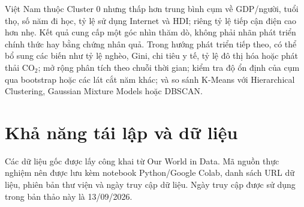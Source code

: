 \documentclass[11pt,a4paper]{article}
\begin{document}
Việt Nam thuộc Cluster 0 nhưng thấp hơn trung bình cụm về GDP/người, tuổi thọ, số năm đi học, tỷ lệ sử dụng Internet và HDI; riêng tỷ lệ tiếp cận điện cao hơn nhẹ. Kết quả cung cấp một góc nhìn thăm dò, không phải nhãn phát triển chính thức hay bằng chứng nhân quả. Trong hướng phát triển tiếp theo, có thể bổ sung các biến như tỷ lệ nghèo, Gini, chi tiêu y tế, tỷ lệ đô thị hóa hoặc phát thải CO$_2$; mở rộng phân tích theo chuỗi thời gian; kiểm tra độ ổn định của cụm qua bootstrap hoặc các lát cắt năm khác; và so sánh K-Means với Hierarchical Clustering, Gaussian Mixture Models hoặc DBSCAN.

\section*{Khả năng tái lập và dữ liệu}

Các dữ liệu gốc được lấy công khai từ Our World in Data. Mã nguồn thực nghiệm nên được lưu kèm notebook Python/Google Colab, danh sách URL dữ liệu, phiên bản thư viện và ngày truy cập dữ liệu. Ngày truy cập được sử dụng trong bản thảo này là 13/09/2026.
\end{document}
